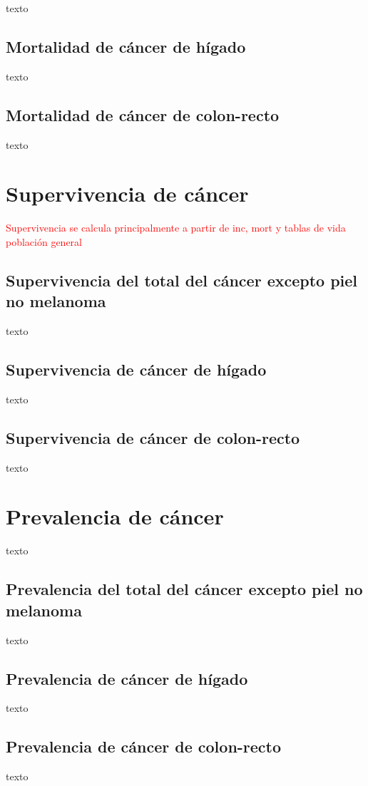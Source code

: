 texto

\subsection{Mortalidad de cáncer de hígado}

texto

\subsection{Mortalidad de cáncer de colon-recto}

texto

\section{Supervivencia de cáncer} 

\textcolor{red}{Supervivencia se calcula principalmente a partir de inc, mort y tablas de vida población general}

\subsection{Supervivencia del total del cáncer excepto piel no melanoma}

texto

\subsection{Supervivencia de cáncer de hígado}

texto

\subsection{Supervivencia de cáncer de colon-recto}

texto

\section{Prevalencia de cáncer}

texto

\subsection{Prevalencia del total del cáncer excepto piel no melanoma}

texto

\subsection{Prevalencia de cáncer de hígado}

texto

\subsection{Prevalencia de cáncer de colon-recto}

texto






